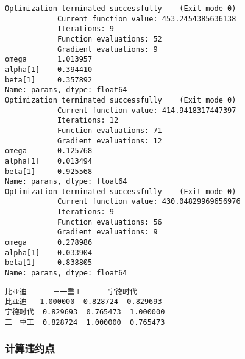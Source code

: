 \documentclass[11pt]{article}
\makeatletter
\newcommand{\boxspacing}{\kern\kvtcb@left@rule\kern\kvtcb@boxsep}
\newcommand{\prompt}[4]{
        {\ttfamily\llap{{\color{#2}[#3]:\hspace{3pt}#4}}\vspace{-\baselineskip}}
    }
\makeatother
\begin{document}
    \begin{Verbatim}[commandchars=\\\{\}]
Optimization terminated successfully    (Exit mode 0)
            Current function value: 453.2454385636138
            Iterations: 9
            Function evaluations: 52
            Gradient evaluations: 9
omega       1.013957
alpha[1]    0.394410
beta[1]     0.357892
Name: params, dtype: float64
Optimization terminated successfully    (Exit mode 0)
            Current function value: 414.9418317447397
            Iterations: 12
            Function evaluations: 71
            Gradient evaluations: 12
omega       0.125768
alpha[1]    0.013494
beta[1]     0.925568
Name: params, dtype: float64
Optimization terminated successfully    (Exit mode 0)
            Current function value: 430.04829969656976
            Iterations: 9
            Function evaluations: 56
            Gradient evaluations: 9
omega       0.278986
alpha[1]    0.033904
beta[1]     0.838805
Name: params, dtype: float64
    \end{Verbatim}

            \begin{tcolorbox}[breakable, size=fbox, boxrule=.5pt, pad at break*=1mm, opacityfill=0]
\prompt{Out}{outcolor}{2}{\boxspacing}
\begin{Verbatim}[commandchars=\\\{\}]
           比亚迪      三一重工      宁德时代
比亚迪   1.000000  0.828724  0.829693
宁德时代  0.829693  0.765473  1.000000
三一重工  0.828724  1.000000  0.765473
\end{Verbatim}
\end{tcolorbox}

    \hypertarget{ux8ba1ux7b97ux8fddux7ea6ux70b9}{%
\subsubsection{计算违约点}\label{ux8ba1ux7b97ux8fddux7ea6ux70b9}}
\end{document}
